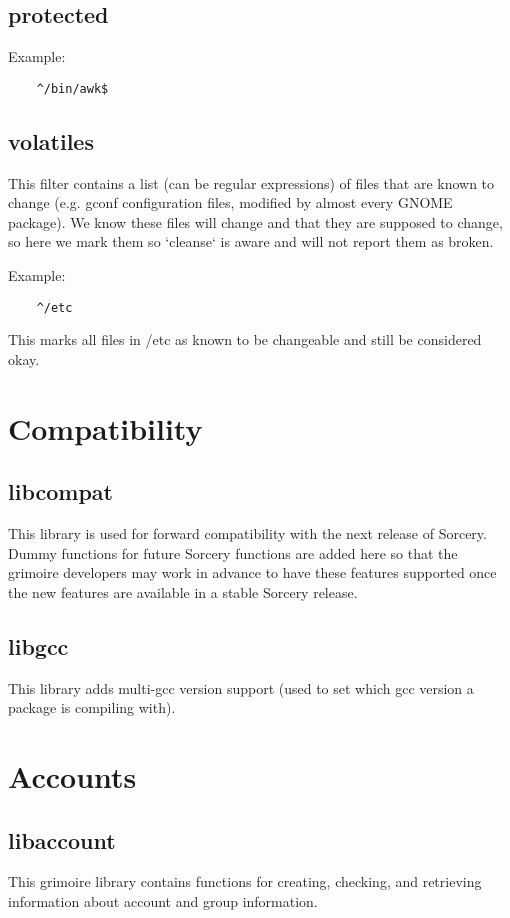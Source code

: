 \documentclass[a4paper,10pt]{book}
\begin{document}
\section{protected}

Example:
\begin{verbatim}
	^/bin/awk$
\end{verbatim}

\section{volatiles}
This filter contains a list (can be regular expressions) of files that are
known to change (e.g. gconf configuration files, modified by almost every
GNOME package). We know these files will change and that they are supposed
to change, so here we mark them so `cleanse` is aware and will not report
them as broken.

Example:
\begin{verbatim}
	^/etc
\end{verbatim}

This marks all files in /etc as known to be changeable and still be
considered okay.

\chapter{Compatibility}
\section{libcompat}
This library is used for forward compatibility with the next release of
Sorcery. Dummy functions for future Sorcery functions are added here so
that the grimoire developers may work in advance to have these features
supported once the new features are available in a stable Sorcery release.

\section{libgcc}
This library adds multi-gcc version support (used to set which gcc version
a package is compiling with).

\chapter{Accounts}
\section{libaccount}
This grimoire library contains functions for creating, checking, and
retrieving information about account and group information.
\end{document}
